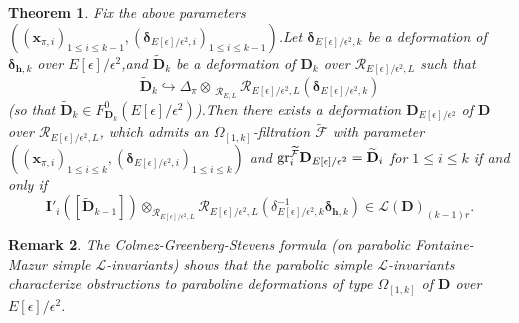 \documentclass[SecEq,CM,GP]{degruyter-crelle} %
\theoremstyle{plain}
\newtheorem{thm}{Theorem}[section]
\newtheorem{rmk}[thm]{Remark}
\newcommand{\Dpik}{{\mathbf{D}}}
\newcommand{\gr}{{\rm gr}}
\newcommand{\omepik}{\Omega_{[1,k]}}
\newcommand{\bx}{{\mathbf{x}}}
\newcommand{\bh}{{\mathbf{h}}}
\newcommand{\cR}{\mathcal R}
\newcommand{\cF}{\mathcal F}
\newcommand{\sL}{\mathcal L}
\begin{document}
\begin{thm}\label{defor1thdefor}Fix the above parameters $((\bx_{\pi,i})_{1\leq i\leq k-1},(\bm{\delta}_{E[\epsilon]/\epsilon^2,i})_{1\leq i\leq k-1})$.\;Let 
$\bm{\delta}_{E[\epsilon]/\epsilon^2,k}$ be a deformation  of  $\bm{\delta}_{\bh,k}$ over $E[\epsilon]/\epsilon^2$,\;and $\widetilde\Dpik_{k}$ be a deformation of $\Dpik_{k}$ over $\cR_{E[\epsilon]/\epsilon^2,L}$ such that \[\widetilde\Dpik_{k}\hookrightarrow {\Delta_\pi}\otimes_{\,\;\cR_{E,L}}\cR_{E[\epsilon]/\epsilon^2,L}(\bm{\delta}_{E[\epsilon]/\epsilon^2,k})\]
(so that $\widetilde\Dpik_{k}\in F^0_{\Dpik_{k}}(E[\epsilon]/\epsilon^2)$).\;Then there exists a deformation $\Dpik_{E[\epsilon]/\epsilon^2}$ of $\Dpik$ over $\cR_{E[\epsilon]/\epsilon^2,L}$,\;
which admits  an $\omepik$-filtration $\widetilde{\cF}$ with parameter $((\bx_{\pi,i})_{1\leq i\leq k},(\bm{\delta}_{E[\epsilon]/\epsilon^2,i})_{1\leq i\leq k})$ and  $\gr^{\widetilde{\cF}}_{i}\Dpik_{E[\epsilon]/\epsilon^2}=\widetilde\Dpik_i$ for $1\leq i\leq k$ if and only if
\[\mathbf{I}'_{i}([\widetilde{\Dpik}_{k-1}])\otimes_{\cR_{E[\epsilon]/\epsilon^2,L}}\cR_{E[\epsilon]/\epsilon^2,L}({\delta}_{E[\epsilon]/\epsilon^2,k}^{-1}\bm{\delta}_{\bh,k})\in \sL(\Dpik)_{(k-1)r}.\]
\end{thm}
\begin{rmk}The Colmez-Greenberg-Stevens formula (on parabolic Fontaine-Mazur simple $\sL$-invariants) shows that the parabolic simple $\sL$-invariants characterize obstructions to paraboline deformations of type $\omepik$  of $\Dpik$ over $E[\epsilon]/\epsilon^2$.\;
\end{rmk}
\end{document}
